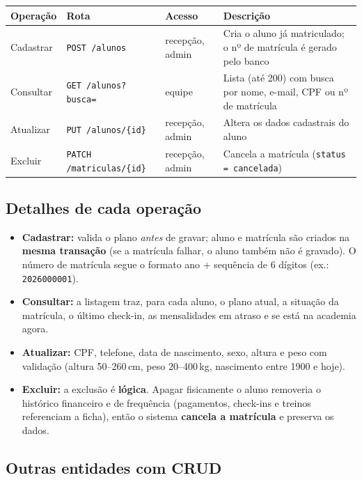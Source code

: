 \documentclass[11pt,a4paper,final]{article}
\newcommand{\cod}[1]{\texttt{#1}}
\begin{document}
\begin{xltabular}{\textwidth}{l l l Y}
  \toprule
  \textbf{Operação} & \textbf{Rota} & \textbf{Acesso} & \textbf{Descrição} \\
  \midrule
  \endhead
  Cadastrar & \cod{POST /alunos}        & recepção, admin & Cria o aluno já matriculado; o nº de matrícula é gerado pelo banco \\
  Consultar & \cod{GET /alunos?busca=}  & equipe          & Lista (até 200) com busca por nome, e-mail, CPF ou nº de matrícula \\
  Atualizar & \cod{PUT /alunos/\{id\}}  & recepção, admin & Altera os dados cadastrais do aluno \\
  Excluir   & \cod{PATCH /matriculas/\{id\}} & recepção, admin & Cancela a matrícula (\cod{status = cancelada}) \\
  \bottomrule
\end{xltabular}

\subsection{Detalhes de cada operação}

\begin{itemize}
  \item \textbf{Cadastrar:} valida o plano \textit{antes} de gravar; aluno e matrícula são criados na
        \textbf{mesma transação} (se a matrícula falhar, o aluno também não é gravado). O número de
        matrícula segue o formato ano + sequência de 6 dígitos (ex.: \cod{2026000001}).
  \item \textbf{Consultar:} a listagem traz, para cada aluno, o plano atual, a situação da matrícula, o
        último check-in, as mensalidades em atraso e se está na academia agora.
  \item \textbf{Atualizar:} CPF, telefone, data de nascimento, sexo, altura e peso com validação
        (altura 50--260\,cm, peso 20--400\,kg, nascimento entre 1900 e hoje).
  \item \textbf{Excluir:} a exclusão é \textbf{lógica}. Apagar fisicamente o aluno removeria o histórico
        financeiro e de frequência (pagamentos, check-ins e treinos referenciam a ficha), então o
        sistema \textbf{cancela a matrícula} e preserva os dados.
\end{itemize}

\subsection{Outras entidades com CRUD}
\end{document}
